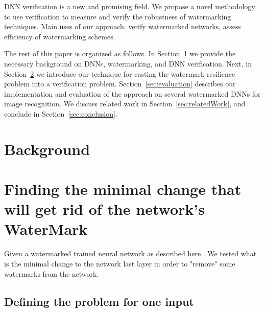 \documentclass[a4paper]{llncs}
\newcommand{\guy}[1]{\marginpar{\textcolor{orange}{Guy: #1}}}
\newcommand{\ben}[1]{\marginpar{\textcolor{blue}{Ben: #1}}}
\begin{document}
DNN verification is a new and promising field. We propose a novel
methodology to use verification to measure and verify the robustness
of watermarking techniques.
Main uses of our approach: verify watermarked networks, assess
efficiency of watermarking schemes.

The rest of this paper is organized as follows. In
Section~\ref{sec:background} we provide the necessary background on
DNNs, watermarking, and DNN verification. Next, in
Section~\ref{sec:verifyWatermarks} we introduce our technique for
casting the watermark resilience problem into a verification
problem. Section~\ref{sec:evaluation} describes our implementation and evaluation of the approach on several watermarked DNNs for image
recognition. We discuss related work in Section~\ref{sec:relatedWork},
and conclude in Section~\ref{sec:conclusion}.

\section{Background}
\label{sec:background}

\cite{KaBaDiJuKo17Reluplex,KaHuIbJuLaLiShThWuZeDiKoBa19Marabou}

\section{Finding the minimal change that will get rid of the network's WaterMark}
\label{sec:verifyWatermarks}

Given a watermarked trained neural network as described
here \cite{AdBaPiKeWatermarking}.
\guy{make this a proper citation}
\ben{ok}
We
tested what is the minimal change to the network last layer in order
to "remove" some watermarks from the network.


\subsection{Defining the problem for one input}
\label{sec:defineProblem1}
\end{document}
